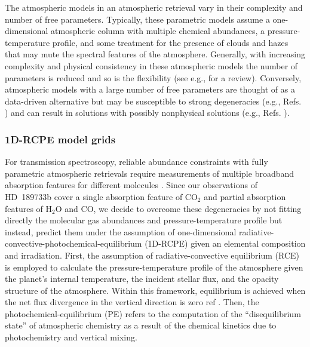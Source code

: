 \documentclass[sn-standardnature]{sn-jnl}%
\begin{document}
The atmospheric models in an atmospheric retrieval vary in their complexity and number of free parameters. Typically, these parametric models assume a one-dimensional atmospheric column with multiple chemical abundances, a pressure-temperature profile, and some treatment for the presence of clouds and hazes that may mute the spectral features of the atmosphere. Generally, with increasing complexity and physical consistency in these atmospheric models the number of parameters is reduced and so is the flexibility (see e.g.,  for a review). Conversely, atmospheric models with a large number of free parameters are thought of as a data-driven alternative but may be susceptible to strong degeneracies (e.g., Refs. ) and can result in solutions with possibly nonphysical solutions (e.g., Refs. ). 



\subsubsection*{1D-RCPE model grids}

For transmission spectroscopy, reliable abundance constraints with fully parametric atmospheric retrievals require measurements of multiple broadband absorption features for different molecules . Since our observations of HD~189733b cover a single absorption feature of CO$_2$ and partial absorption features of H$_2$O and CO, we decide to overcome these degeneracies by not fitting directly the molecular gas abundances and pressure-temperature profile but instead, predict them under the assumption of one-dimensional radiative-convective-photochemical-equilibrium (1D-RCPE) given an elemental composition and irradiation. First, the assumption of radiative-convective equilibrium (RCE)  is employed to calculate the pressure-temperature profile of the atmosphere given the planet's internal temperature, the incident stellar flux, and the opacity structure of the atmosphere. Within this framework, equilibrium is achieved when the net flux divergence in the vertical direction is zero ref . Then, the photochemical-equilibrium (PE) refers to the computation of the ``disequilibrium state'' of atmospheric chemistry as a result of the chemical kinetics due to photochemistry and vertical mixing. 
\end{document}
